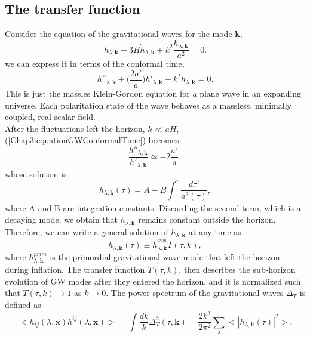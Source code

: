 \documentclass[11pt,a4paper,twoside]{book}
\begin{document}
\subsection{The transfer function}
Consider the equation of the gravitational waves for the mode \textbf{k},
\begin{equation}
	\ddot{h}_{\lambda,\textbf{k}} + 3H\dot{h}_{\lambda,\textbf{k}}+ k^{2}\frac{h_{\lambda,\textbf{k}}}{a^{2}}=0.
\end{equation}
we can express it in terms of the conformal time,
\begin{equation}
	\label{Chap3:equationGWConformalTime}
	h''_{\lambda,\textbf{k}} + \Big (\frac{2a'}{a}\Big)h'_{\lambda,\textbf{k}} + k^{2}h_{\lambda,\textbf{k}} = 0.
\end{equation}
This is just the massles Klein-Gordon equation for a plane wave in an expanding universe. Each polaritation state of the wave behaves as a massless, minimally coupled, real scalar field. \\
After the fluctuations left the horizon, $ k \ll aH $, (\ref{Chap3:equationGWConformalTime}) becomes
\begin{equation}
	\label{Chap3:solutionEquationConformalTime1}
	\frac{h''_{\lambda,\textbf{k}}}{h'_{\lambda,\textbf{k}}} \simeq -2 \frac{a'}{a}, 
\end{equation}
whose solution is
\begin{equation}
	\label{Chap3:solutionGWEquationConformalTime2}
	h_{\lambda,\textbf{k}}(\tau)=A + B \int_{}^{\tau}\frac{d\tau '}{a^{2}(\tau)},
\end{equation}
where A and B are integration constants. Discarding the second term, which is a decaying mode, we obtain that $ h_{\lambda,\textbf{k}} $ remains constant outside the horizon. Therefore, we can write a general solution of $ h_{\lambda,\textbf{k}} $ at any time as 
\begin{equation}
	\label{Chap3:transferFunction}
	h_{\lambda,\textbf{k}}(\tau) \equiv h_{\lambda,\textbf{k}}^{^{prim}}T(\tau, k),
\end{equation}
where $ h^{prim}_{\lambda,\textbf{k}} $ is the primordial gravitational wave mode that left the horizon during inflation. The transfer function $ T(\tau,k) $, then describes the sub-horizon evolution of GW modes after they  entered the horizon, and it is normalized such that $T (\tau,k) \rightarrow 1 $ as $ k \rightarrow 0$. The power spectrum of the gravitational waves $\Delta_{T}$ is defined as
\begin{equation}
	<h_{ij}(\lambda,\textbf{x})h^{ij}(\lambda,\textbf{x})> = \int \frac{dk}{k}\Delta_{T}^{2}(\tau,\textbf{k}) = \frac{2k^{3}}{2\pi^{2}}\sum_{\lambda}<|h_{\lambda,\textbf{k}}(\tau)|^{2}>.
\end{equation}
\end{document}
